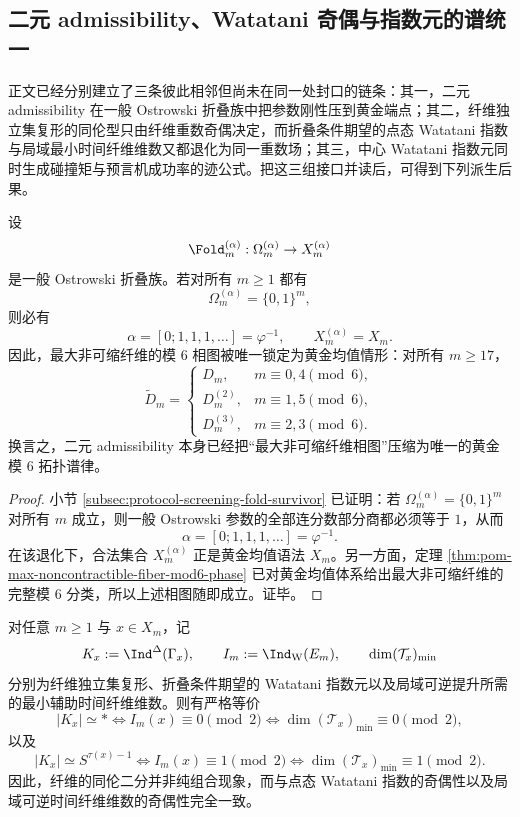 \subsection{二元 admissibility、Watatani 奇偶与指数元的谱统一}

正文已经分别建立了三条彼此相邻但尚未在同一处封口的链条：其一，二元 admissibility 在一般 Ostrowski 折叠族中把参数刚性压到黄金端点；其二，纤维独立集复形的同伦型只由纤维重数奇偶决定，而折叠条件期望的点态 Watatani 指数与局域最小时间纤维维数又都退化为同一重数场；其三，中心 Watatani 指数元同时生成碰撞矩与预言机成功率的迹公式。把这三组接口并读后，可得到下列派生后果。

\begin{theorem}\label{thm:derived-binary-admissibility-golden-topophase}
设
\[
\Fold_m^{(\alpha)}:\Omega_m^{(\alpha)}\to X_m^{(\alpha)}
\]
是一般 Ostrowski 折叠族。若对所有 \(m\ge 1\) 都有
\[
\Omega_m^{(\alpha)}=\{0,1\}^m,
\]
则必有
\[
\alpha=[0;1,1,1,\dots]=\varphi^{-1},
\qquad
X_m^{(\alpha)}=X_m.
\]
因此，最大非可缩纤维的模 \(6\) 相图被唯一锁定为黄金均值情形：对所有 \(m\ge 17\)，
\[
\widetilde D_m=
\begin{cases}
D_m, & m\equiv 0,4\pmod 6,\\[2pt]
D_m^{(2)}, & m\equiv 1,5\pmod 6,\\[2pt]
D_m^{(3)}, & m\equiv 2,3\pmod 6.
\end{cases}
\]
换言之，二元 admissibility 本身已经把“最大非可缩纤维相图”压缩为唯一的黄金模 \(6\) 拓扑谱律。
\end{theorem}

\begin{proof}
小节 \ref{subsec:protocol-screening-fold-survivor} 已证明：若
\(
\Omega_m^{(\alpha)}=\{0,1\}^m
\)
对所有 \(m\) 成立，则一般 Ostrowski 参数的全部连分数部分商都必须等于 \(1\)，从而
\[
\alpha=[0;1,1,1,\dots]=\varphi^{-1}.
\]
在该退化下，合法集合 \(X_m^{(\alpha)}\) 正是黄金均值语法 \(X_m\)。另一方面，定理 \ref{thm:pom-max-noncontractible-fiber-mod6-phase} 已对黄金均值体系给出最大非可缩纤维的完整模 \(6\) 分类，所以上述相图随即成立。证毕。
\end{proof}

\begin{theorem}\label{thm:derived-fiber-watatani-time-parity-equivalence}
对任意 \(m\ge 1\) 与 \(x\in X_m\)，记
\[
K_x:=\Ind^{\Delta}(\Gamma_x),
\qquad
I_m:=\Ind_{\mathrm W}(E_m),
\qquad
\dim(\mathcal T_x)_{\min}
\]
分别为纤维独立集复形、折叠条件期望的 Watatani 指数元以及局域可逆提升所需的最小辅助时间纤维维数。则有严格等价
\[
|K_x|\simeq \ast
\iff
I_m(x)\equiv 0 \pmod 2
\iff
\dim(\mathcal T_x)_{\min}\equiv 0 \pmod 2,
\]
以及
\[
|K_x|\simeq S^{\tau(x)-1}
\iff
I_m(x)\equiv 1 \pmod 2
\iff
\dim(\mathcal T_x)_{\min}\equiv 1 \pmod 2.
\]
因此，纤维的同伦二分并非纯组合现象，而与点态 Watatani 指数的奇偶性以及局域可逆时间纤维维数的奇偶性完全一致。
\end{theorem}

